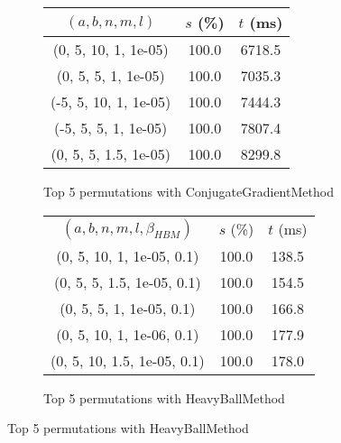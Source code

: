 \begin{figure}[H]
\begin{subfigure}[ht]{.5\textwidth}
\begin{tabular}{|c|c|c|}
\hline
\rowcolor{gray!25}
$(a,b,n,m,l)$ & $s$ (\%) & $t$ (ms) \\
\hline
(0, 5, 10, 1, 1e-05) & 100.0 & 6718.5 \\
(0, 5, 5, 1, 1e-05) & 100.0 & 7035.3 \\
(-5, 5, 10, 1, 1e-05) & 100.0 & 7444.3 \\
(-5, 5, 5, 1, 1e-05) & 100.0 & 7807.4 \\
(0, 5, 5, 1.5, 1e-05) & 100.0 & 8299.8 \\
\hline
\end{tabular}
\caption{Top 5 permutations with ConjugateGradientMethod}
\label{subfig:param_comp_NegativeEntropy_ConjugateGradientMethod_UniformSearch}
\end{subfigure}
\hfill
\begin{subfigure}[ht]{.5\textwidth}
\begin{tabular}{|c|c|c|}
\hline
\rowcolor{gray!25}
\multicolumn{3}{|c|}{HeavyBallMethod} \\
\hline
\rowcolor{gray!25}
$(a,b,n,m,l,\beta_{HBM})$ & $s$ (\%) & $t$ (ms) \\
\hline
(0, 5, 10, 1, 1e-05, 0.1) & 100.0 & 138.5 \\
(0, 5, 5, 1.5, 1e-05, 0.1) & 100.0 & 154.5 \\
(0, 5, 5, 1, 1e-05, 0.1) & 100.0 & 166.8 \\
(0, 5, 10, 1, 1e-06, 0.1) & 100.0 & 177.9 \\
(0, 5, 10, 1.5, 1e-05, 0.1) & 100.0 & 178.0 \\
\hline
\end{tabular}
\caption{Top 5 permutations with HeavyBallMethod}
\label{subfig:param_comp_NegativeEntropy_HeavyBallMethod_UniformSearch}
\end{subfigure}
\end{figure}
\restoregeometry
